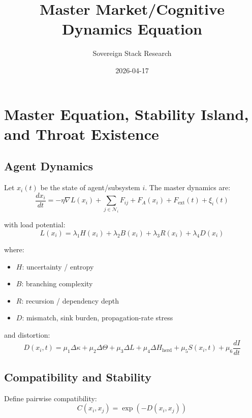 \documentclass[11pt,a4paper]{article}
\title{Master Market/Cognitive Dynamics Equation}
\author{Sovereign Stack Research}
\date{2026-04-17}
\begin{document}
\maketitle

\section{Master Equation, Stability Island, and Throat Existence}

\subsection{Agent Dynamics}

Let $x_i(t)$ be the state of agent/subsystem $i$. The master dynamics are:
\begin{equation}
\frac{dx_i}{dt} = -\eta \nabla L(x_i) + \sum_{j \in \mathcal{N}_i} F_{ij} + F_A(x_i) + F_{\mathrm{ext}}(t) + \xi_i(t)
\label{eq:master_dynamics}
\end{equation}

with load potential:
\begin{equation}
L(x_i) = \lambda_1 H(x_i) + \lambda_2 B(x_i) + \lambda_3 R(x_i) + \lambda_4 D(x_i)
\label{eq:load_potential}
\end{equation}

where:
\begin{itemize}
    \item $H$: uncertainty / entropy
    \item $B$: branching complexity
    \item $R$: recursion / dependency depth
    \item $D$: mismatch, sink burden, propagation-rate stress
\end{itemize}

and distortion:
\begin{equation}
D(x_i, t) = \mu_1 \Delta\kappa + \mu_2 \Delta\Theta + \mu_3 \Delta L + \mu_4 \Delta H_{\mathrm{herd}} + \mu_5 S(x_i, t) + \mu_6 \frac{dI}{dt}
\label{eq:distortion}
\end{equation}

\subsection{Compatibility and Stability}

Define pairwise compatibility:
\begin{equation}
C(x_i, x_j) = \exp(-D(x_i, x_j))
\label{eq:pairwise_compat}
\end{equation}
\end{document}
